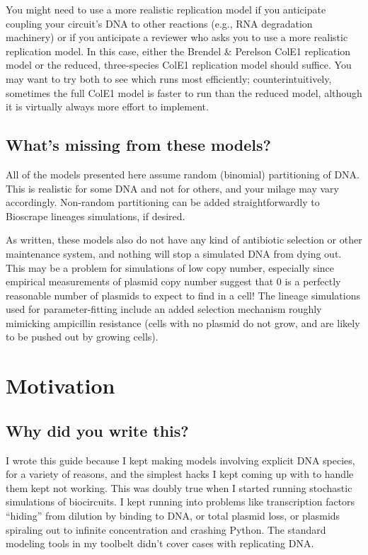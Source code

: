 \documentclass[preprint,12pt]{oldplainarticle}
\begin{document}
You might need to use a more realistic replication model if you anticipate coupling your circuit's DNA to other reactions (e.g., RNA degradation machinery) or if you anticipate a reviewer who asks you to use a more realistic replication model. In this case, either the Brendel \& Perelson ColE1 replication model or the reduced, three-species ColE1 replication model should suffice. You may want to try both to see which runs most efficiently; counterintuitively, sometimes the full ColE1 model is faster to run than the reduced model, although it is virtually always more effort to implement. 

\subsection{What's missing from these models?}

All of the models presented here assume random (binomial) partitioning of DNA. This is realistic for some DNA and not for others, and your milage may vary accordingly. Non-random partitioning can be added straightforwardly to Bioscrape lineages simulations, if desired. 

As written, these models also do not have any kind of antibiotic selection or other maintenance system, and nothing will stop a simulated DNA from dying out. This may be a problem for simulations of low copy number, especially since empirical measurements of plasmid copy number suggest that 0 is a perfectly reasonable number of plasmids to expect to find in a cell! The lineage simulations used for parameter-fitting include an added selection mechanism roughly mimicking ampicillin resistance (cells with no plasmid do not grow, and are likely to be pushed out by growing cells).

\section{Motivation}\label{S:motivation}

\subsection{Why did you write this?}

I wrote this guide because I kept making models involving explicit DNA species, for a variety of reasons, and the simplest hacks I kept coming up with to handle them kept not working. This was doubly true when I started running stochastic simulations of biocircuits. I kept running into problems like transcription factors ``hiding'' from dilution by binding to DNA, or total plasmid loss, or plasmids spiraling out to infinite concentration and crashing Python. The standard modeling tools in my toolbelt didn't cover cases with replicating DNA.
\end{document}
